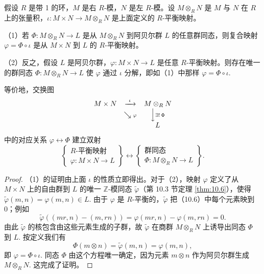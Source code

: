 \begin{theorem}\label{thm:10.10}
假设 \(R\) 是带 1 的环，\(M\) 是右 \(R\)-模，\(N\) 是左 \(R\)-模。设 \(M \otimes_R N\) 是 \(M\) 与 \(N\) 在 \(R\) 上的张量积，\(\iota : M \times N \to M \otimes_R N\) 是上面定义的 \(R\)-平衡映射。

（1）若 \(\Phi : M \otimes_R N \to L\) 是从 \(M \otimes_R N\) 到阿贝尔群 \(L\) 的任意群同态，则复合映射 \(\varphi = \Phi \circ \iota\) 是从 \(M \times N\) 到 \(L\) 的 \(R\)-平衡映射。

（2）反之，假设 \(L\) 是阿贝尔群，\(\varphi : M \times N \to L\) 是任意 \(R\)-平衡映射。则存在唯一的群同态 \(\Phi : M \otimes_R N \to L\) 使 \(\varphi\) 通过 \(\iota\) 分解，即如（1）中那样 \(\varphi = \Phi \circ \iota\).

等价地，交换图
\[
\begin{array}{ccc}
M \times N & \xrightarrow{\ \iota\ } & M \otimes_R N \\
& \searrow{\scriptstyle \varphi} & \Big\downarrow{\scriptstyle \exists!\,\Phi} \\
& & L
\end{array}
\]
中的对应关系 \(\varphi \leftrightarrow \Phi\) 建立双射
\[
\left\{\begin{array}{c} R\text{-平衡映射} \\ \varphi : M \times N \to L\end{array}\right\}
\longleftrightarrow
\left\{\begin{array}{c} \text{群同态} \\ \Phi : M \otimes_R N \to L\end{array}\right\}.
\]
\end{theorem}

\begin{proof}
（1）的证明由上面 \(\iota\) 的性质立即得出。对于（2），映射 \(\varphi\) 定义了从 \(M \times N\) 上的自由群到 \(L\) 的唯一 \(\mathbb{Z}\)-模同态 \(\tilde{\varphi}\)（第 10.3 节定理 \ref{thm:10.6}），使得 \(\tilde{\varphi}(m, n) = \varphi(m, n) \in L\). 由于 \(\varphi\) 是 \(R\)-平衡的，\(\tilde{\varphi}\) 把（10.6）中每个元素映到 0；例如
\[
\tilde{\varphi}((mr, n)-(m, rn)) = \varphi(mr, n)-\varphi(m, rn) = 0.
\]
由此 \(\tilde{\varphi}\) 的核包含由这些元素生成的子群，故 \(\tilde{\varphi}\) 在商群 \(M \otimes_R N\) 上诱导出同态 \(\Phi\) 到 \(L\). 按定义我们有
\[
\Phi(m \otimes n) = \tilde{\varphi}(m, n) = \varphi(m, n),
\]
即 \(\varphi = \Phi \circ \iota\). 同态 \(\Phi\) 由这个方程唯一确定，因为元素 \(m \otimes n\) 作为阿贝尔群生成 \(M \otimes_R N\). 这完成了证明。
\end{proof}

